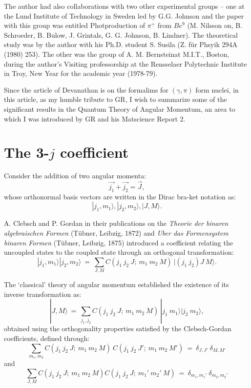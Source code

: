 The author had also collaborations with two other experimental groups -- one at the Lund Institute of Technology in Sweden led by G.G. Johnson and the paper with this group was  entitled Photproduction of $\pi^+$ from $Be^9$ (M. Nilsson on, B. Schroeder, B. Bulow, J. Grintals, G. G. Johnson, B. Lindner). The theoretical study was by the author with his Ph.D. student S. Susila (Z. für Phsyik 294A (1980) 253). The other was the group of A. M. Bernsteinat M.I.T., Boston, during the author's Visiting professorship at the Rensselaer Polytechnic Institute in Troy, New Year for the academic year (1978-79).

Since the article of Devanathan is on the formalims for $(\gamma,\pi)$ form nuclei, in this article, as my humble tribute to GR, I wish to summarize some of the significant results in the Quantum Theory of Angular Momentum, an area to which I was introduced by GR and his Matscience Report 2.

\section*{The 3-$j$ coefficient}

Consider the addition of two angular momenta:
\makeatletter
{}
\makeatother
\begin{equation}
\vec{j_1} + \vec{j_2} = \vec{J}, \label{chap29-eq1} 
\end{equation}
whose orthonormal basis vectors are written in the Dirac bra-ket notation as:
\begin{equation} 
|j_1,m_1\rangle , |j_2,m_2\rangle, |J,M\rangle. \label{chap29-eq2}
\end{equation}

A. Clebsch and P. Gordan in their publications on the \textit{Theorie der binaren algebraischen Formen} (Tübner, Leibzig, 1872) and \textit{Uber das Formensystem binaren Formen} (Tübner, Leibzig, 1875) introduced a coefficient relating the uncoupled states to the coupled state through an orthogonal transformation:
\begin{equation}
|j_1,m_1\rangle|j_2,m_2\rangle\ =\ \sum_{J,M} C(j_1\ j_2\ J;\ m_1\ m_2\ M)\ |(j_1\ j_2)J\ M\rangle. \label{chap29-eq3}
\end{equation}

The `classical' theory of angular momentum established the existence of its inverse transformation as:
\begin{equation}
|J,M\rangle\ =\ \sum_{j_1,j_2} C(j_1\ j_2\ J;\ m_1\ m_2\ M)\ |j_1\ m_1\rangle |j _2\  m_2\rangle, \label{chap29-eq4}
\end{equation}
obtained using the orthogonality properties satisfied by the Clebsch-Gordan coefficients, defined through:
\begin{equation}
\sum_{m_1,m_2} C(j_1\ j_2\ J;\ m_1\ m_2\ M)\ C(j_1\ j_2\ J';\ m_1\ m_2\ M')\ =\ \delta_{J,J'}\ \delta_{M,M'} \label{chap29-eq5}
\end{equation}
and
\begin{equation}
\sum_{J,M} C(j_1\ j_2\ J;\ m_1\ m_2\ M)C(j_1\ j_2\ J;\ m_1'\ m_2'\ M)\ =\ \delta_{m_1,m_1'} \ \delta_{m_2,m_2'} \label{chap29-eq6}
\end{equation}

